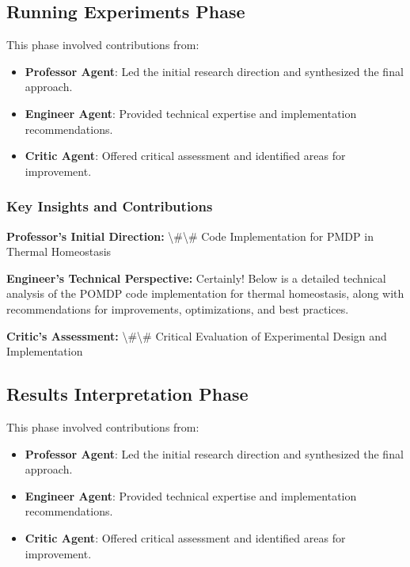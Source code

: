 \documentclass[11pt,a4paper]{article}
\begin{document}
\subsection{Running Experiments Phase}


This phase involved contributions from:

\begin{itemize}
\item \textbf{Professor Agent}: Led the initial research direction and synthesized the final approach.
\item \textbf{Engineer Agent}: Provided technical expertise and implementation recommendations.
\item \textbf{Critic Agent}: Offered critical assessment and identified areas for improvement.
\end{itemize}

\subsubsection{Key Insights and Contributions}


\textbf{Professor's Initial Direction:} \textbackslash{}#\textbackslash{}# Code Implementation for PMDP in Thermal Homeostasis


\textbf{Engineer's Technical Perspective:} Certainly! Below is a detailed technical analysis of the POMDP code implementation for thermal homeostasis, along with recommendations for improvements, optimizations, and best practices.


\textbf{Critic's Assessment:} \textbackslash{}#\textbackslash{}# Critical Evaluation of Experimental Design and Implementation


\subsection{Results Interpretation Phase}


This phase involved contributions from:

\begin{itemize}
\item \textbf{Professor Agent}: Led the initial research direction and synthesized the final approach.
\item \textbf{Engineer Agent}: Provided technical expertise and implementation recommendations.
\item \textbf{Critic Agent}: Offered critical assessment and identified areas for improvement.
\end{itemize}
\end{document}
